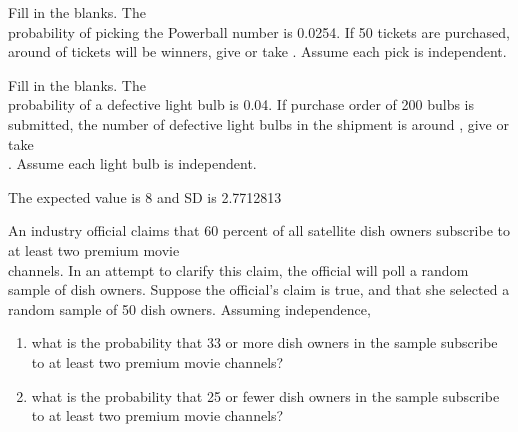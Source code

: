 \documentclass[11pt, chapterprefix=true]{scrbook}\usepackage[]{graphicx}\usepackage[]{color}
\begin{document}
\begin{exercises}
\begin{solution}
  \end{solution}

	\begin{exercise}  %

Fill in the blanks. The \\ probability of picking the Powerball number is  0.0254. If 50 tickets are purchased, around \underline{\phantom{xxxxxxxx}} of  tickets will be winners,  give or take  \underline{\phantom{xxxxxxxx}}.    Assume each pick is independent.
	\end{exercise}
%

		\begin{exercise}  %

Fill in the blanks. The \\ probability of a defective light bulb is 0.04. If purchase order of 200 bulbs is submitted, the number of defective light bulbs in the shipment is around \underline{\phantom{xxxxxxxx}}, give or take \\ \underline{\phantom{xxxxxxxx}}. Assume each light bulb is independent.
	  \end{exercise}
	  \begin{solution}  %


The expected value is 8 and SD is 2.7712813
	\end{solution}

  \begin{exercise}   %

An industry official claims that 60 percent of all satellite dish owners subscribe to at least two premium movie \\ channels.  In an attempt to clarify this claim, the official will poll a random sample of dish owners.  Suppose the official's claim is true, and that she selected a random sample of 50 dish owners.  Assuming independence,

\begin{enumerate}
\item what is the probability that 33 or more dish owners in the sample subscribe to at least two premium movie channels?
\item what is the probability that 25 or fewer dish owners in the sample subscribe to at least two premium movie channels?
\end{enumerate}
\end{exercise}
\begin{solution}




\end{solution}
\end{exercises}
\end{document}
